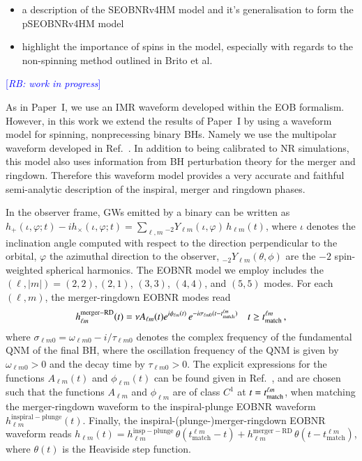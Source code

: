 \documentclass[twocolumn,prd,superscriptaddress,amsfonts,amssymb,amsmath,preprintnumbers]{revtex4-1}
\newcommand{\paperone}{Paper~I\xspace}
\newcommand{\rb}[1]{\textcolor{blue}{[\textit{RB: #1}]}}
\begin{document}
\begin{itemize}
\item{a description of the SEOBNRv4HM model and it's generalisation to form the pSEOBNRv4HM model}
\item{highlight the importance of spins in the model, especially with regards to the non-spinning method outlined in Brito et al.}
\end{itemize}

\rb{work in progress}

As in \paperone, we use an IMR waveform developed within the EOB formalism. However, in this work we  extend the results of \paperone by using a waveform model for spinning, nonprecessing binary BHs. Namely we use the multipolar waveform developed in Ref.~\citep{Cotesta:2018fcv}. In addition to being calibrated to NR simulations, this model also uses information from BH perturbation theory for the merger and ringdown. Therefore this waveform model provides a very accurate and faithful semi-analytic description of the inspiral, merger and ringdown phases. 


In the observer frame, GWs emitted by a binary can be written as 
$h_+(\iota,\varphi;t ) - i h_\times(\iota,\varphi;t) = \sum_{\ell, m} {}_{-\!2}Y_{\ell m}(\iota,\varphi)\, h_{\ell m}(t)$, where $\iota$ denotes the inclination angle computed with respect to the direction perpendicular to the orbital, $\varphi$ the azimuthal direction to the observer, ${}_{-\!2}Y_{\ell m}(\theta,\phi)$ are the $-2$ spin-weighted spherical harmonics. The EOBNR model we employ includes the $(\ell, |m|)=(2,2),(2,1)$, $(3,3)$, $(4,4)$, and $(5,5)$ modes.  For each $(\ell, m)$, the merger-ringdown EOBNR modes read~\citep{Cotesta:2018fcv}
%
\begin{equation}
  \label{RD}
  h_{\ell m}^\mathrm{merger-RD}(t) = \nu A_{\ell m}(t) e^{i\phi_{\ell m} (t)}\,
  e^{-i\sigma_{\ell m0} (t-t_\mathrm{match}^{\ell m})} \quad t \geq t_{\rm match}^{\ell m}\,,
\end{equation}
%
where $\sigma_{\ell m0} = \omega_{\ell m 0} -i/\tau_{\ell m 0}$ denotes the complex frequency of the fundamental QNM of the final BH,  where the oscillation frequency of the QNM is given by $\omega_{\ell m  0}>0$ and the decay time by $\tau_{\ell m 0}>0$. The explicit expressions for the functions $A_{\ell m}(t)$ and $\phi_{\ell m} (t)$ can be found given in Ref.~\citep{Cotesta:2018fcv}, and are chosen such that the functions $A_{\ell  m}$ and $\phi_{\ell  m}$ are of class $C^1$ at $t=  t_{\rm match}^{\ell m}$, when matching the merger-ringdown waveform to the inspiral-plunge EOBNR 
waveform $h_{\ell m}^\mathrm{inspiral-plunge}(t)$. Finally, the inspiral-(plunge-)merger-ringdown EOBNR waveform reads $h_{\ell m}(t) = h_{\ell m}^\mathrm{insp-plunge}\, \theta(t_\mathrm{match}^{\ell m} - t) + h_{\ell m}^\mathrm{merger-RD}\,\theta(t-t_\mathrm{
    match}^{\ell m})$, where $\theta(t)$ is the Heaviside step function.
 
\end{document}
